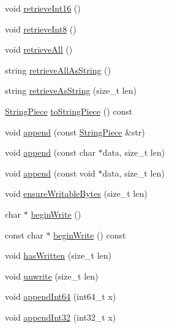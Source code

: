 \begin{DoxyCompactItemize}
\item 
void \hyperlink{classmuduo_1_1net_1_1Buffer_a78a272f407b370f1a5e0d30d0bdcf131}{retrieve\+Int16} ()
\item 
void \hyperlink{classmuduo_1_1net_1_1Buffer_a4605c83f07f06cc12d0ab3a2d54be43e}{retrieve\+Int8} ()
\item 
void \hyperlink{classmuduo_1_1net_1_1Buffer_af505ce71f8935bcfaa932d304c295173}{retrieve\+All} ()
\item 
string \hyperlink{classmuduo_1_1net_1_1Buffer_ac902667b575515cba5b54ddf3a5d10aa}{retrieve\+All\+As\+String} ()
\item 
string \hyperlink{classmuduo_1_1net_1_1Buffer_a2f372acde2975d2cd9a7633148db7e7f}{retrieve\+As\+String} (size\+\_\+t len)
\item 
\hyperlink{classmuduo_1_1StringPiece}{String\+Piece} \hyperlink{classmuduo_1_1net_1_1Buffer_a78096dee3d0826efb63a5b814eef37c4}{to\+String\+Piece} () const
\item 
void \hyperlink{classmuduo_1_1net_1_1Buffer_af02baace4e1946f318dfa5c4d5d4bb3c}{append} (const \hyperlink{classmuduo_1_1StringPiece}{String\+Piece} \&str)
\item 
void \hyperlink{classmuduo_1_1net_1_1Buffer_adece1d853752b95184d19c78228a0c39}{append} (const char $\ast$data, size\+\_\+t len)
\item 
void \hyperlink{classmuduo_1_1net_1_1Buffer_af4c97664922a815eb9aa9dfe78686007}{append} (const void $\ast$data, size\+\_\+t len)
\item 
void \hyperlink{classmuduo_1_1net_1_1Buffer_a1185aa5bbe069f50c8d46a9f8d5aac32}{ensure\+Writable\+Bytes} (size\+\_\+t len)
\item 
char $\ast$ \hyperlink{classmuduo_1_1net_1_1Buffer_a71778facb9cd13bc2403edf59621f3f5}{begin\+Write} ()
\item 
const char $\ast$ \hyperlink{classmuduo_1_1net_1_1Buffer_a46f79eca290d4d4cee634e3c1b50c57d}{begin\+Write} () const
\item 
void \hyperlink{classmuduo_1_1net_1_1Buffer_ae29d7ca8954d0ec7da6363221c80a245}{has\+Written} (size\+\_\+t len)
\item 
void \hyperlink{classmuduo_1_1net_1_1Buffer_a851a742d16106f81629a5315d80e0616}{unwrite} (size\+\_\+t len)
\item 
void \hyperlink{classmuduo_1_1net_1_1Buffer_a7e283b380d5c67b86e150324bbb0546a}{append\+Int64} (int64\+\_\+t x)
\item 
void \hyperlink{classmuduo_1_1net_1_1Buffer_a93760f95378988318124352dbf222e67}{append\+Int32} (int32\+\_\+t x)

\end{DoxyCompactItemize}
